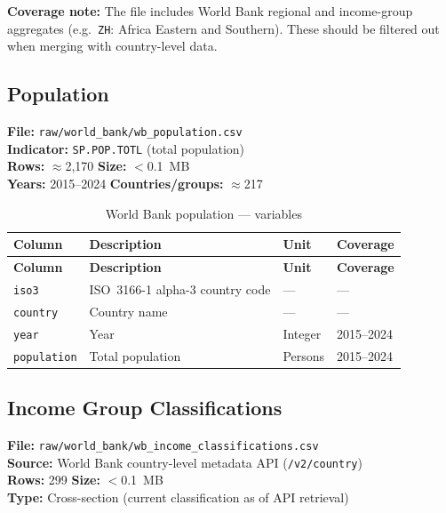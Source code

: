\documentclass[11pt,a4paper]{article}
\begin{document}
\noindent\textbf{Coverage note:} The file includes World Bank regional and income-group
aggregates (e.g.\ \texttt{ZH}: Africa Eastern and Southern).  These should be
filtered out when merging with country-level data.

\subsection{Population}
\label{subsec:wb_pop}

\textbf{File:} \texttt{raw/world\_bank/wb\_population.csv}\\
\textbf{Indicator:} \texttt{SP.POP.TOTL} (total population)\\
\textbf{Rows:} $\approx$2{,}170 \quad \textbf{Size:} $<$0.1~MB\\
\textbf{Years:} 2015--2024 \quad \textbf{Countries/groups:} $\approx$217

\begin{longtable}{L{2.8cm} L{5.5cm} C{2.2cm} C{2.5cm}}
    \caption{World Bank population --- variables}
    \label{tab:wb_pop}\\
    \toprule
    \textbf{Column} & \textbf{Description} & \textbf{Unit} & \textbf{Coverage} \\
    \midrule
    \endfirsthead
    \toprule
    \textbf{Column} & \textbf{Description} & \textbf{Unit} & \textbf{Coverage} \\
    \midrule
    \endhead
    \bottomrule
    \endlastfoot
    \texttt{iso3}       & ISO~3166-1 alpha-3 country code & --- & --- \\
    \texttt{country}    & Country name & --- & --- \\
    \texttt{year}       & Year & Integer & 2015--2024 \\
    \texttt{population} & Total population & Persons & 2015--2024 \\
\end{longtable}

\subsection{Income Group Classifications}
\label{subsec:wb_income}

\textbf{File:} \texttt{raw/world\_bank/wb\_income\_classifications.csv}\\
\textbf{Source:} World Bank country-level metadata API (\texttt{/v2/country})\\
\textbf{Rows:} 299 \quad \textbf{Size:} $<$0.1~MB\\
\textbf{Type:} Cross-section (current classification as of API retrieval)
\end{document}
